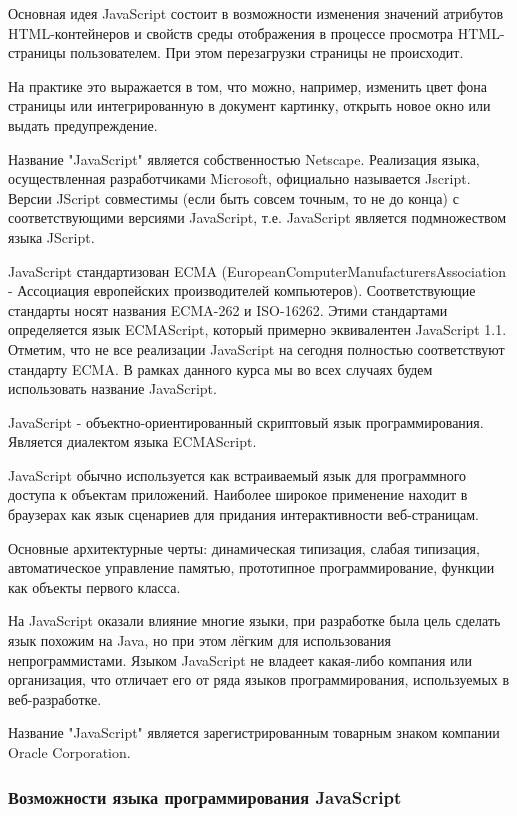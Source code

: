 Основная идея JavaScript состоит в возможности изменения значений атрибутов HTML-контейнеров и свойств среды отображения в процессе просмотра HTML-страницы пользователем. При этом перезагрузки страницы не происходит.

На практике это выражается в том, что можно, например, изменить цвет фона страницы или интегрированную в документ картинку, открыть новое окно или выдать предупреждение.

Название "JavaScript" является собственностью Netscape. Реализация языка, осуществленная разработчиками Microsoft, официально называется Jscript. Версии JScript совместимы (если быть совсем точным, то не до конца) с соответствующими версиями JavaScript, т.е. JavaScript является подмножеством языка JScript.

JavaScript стандартизован ECMA (European\-Computer\-Manufacturers\-Association - Ассоциация европейских производителей компьютеров). Соответствующие стандарты носят названия ECMA-262 и ISO-16262. Этими стандартами определяется язык ECMAScript, который примерно эквивалентен JavaScript 1.1. Отметим, что не все реализации JavaScript на сегодня полностью соответствуют стандарту ECMA. В рамках данного курса мы во всех случаях будем использовать название JavaScript.

JavaScript - объектно-ориентированный скриптовый язык программирования. Является диалектом языка ECMAScript.

JavaScript обычно используется как встраиваемый язык для программного доступа к объектам приложений. Наиболее широкое применение находит в браузерах как язык сценариев для придания интерактивности веб-страницам.

Основные архитектурные черты: динамическая типизация, слабая типизация, автоматическое управление памятью, прототипное программирование, функции как объекты первого класса.

На JavaScript оказали влияние многие языки, при разработке была цель сделать язык похожим на Java, но при этом лёгким для использования непрограммистами. Языком JavaScript не владеет какая-либо компания или организация, что отличает его от ряда языков программирования, используемых в веб-разработке.

Название "JavaScript" является зарегистрированным товарным знаком компании Oracle Corporation.

\subsubsection{Возможности языка программирования JavaScript}
\
\newline

